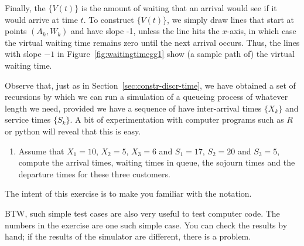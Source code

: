 Finally, the  $\{V(t)\}$ is the
amount of waiting that an arrival would see if it would arrive at time
$t$. To construct $\{V(t)\}$, we simply draw lines that start at
points $(A_k, W_k)$ and have slope -1, unless the line hits the
$x$-axis, in which case the virtual waiting time remains zero until
the next arrival occurs.  Thus, the lines with slope $-1$ in
Figure~\ref{fig:waitingtimegg1} show (a sample path of) the virtual
waiting time.


Observe that, just as in Section~\ref{sec:constr-discr-time}, we have
obtained a set of recursions by which we can run a simulation of a
queueing process of whatever length we need, provided we have a
sequence of have inter-arrival times $\{X_k\}$ and service times
$\{S_k\}$.  A bit of experimentation with computer programs such as
$R$ or python will reveal that this is easy.


\begin{question}
  \begin{enumerate}
  \item Assume that $X_1=10$, $X_2=5$, $X_3=6$ and $S_1 = 17$,
    $S_2=20$ and $S_3=5$, compute the arrival times, waiting times in
    queue, the sojourn times and the departure times for these three
    customers.
  \end{enumerate}
  \begin{solution}
     The intent of this exercise is
      to make you familiar with the notation.

      BTW, such simple test cases are also very useful to test
      computer code. The numbers in the exercise are one such simple
      case. You can check the results by hand; if the results of the
      simulator are different, there is a problem.
    \end{solution}
  \end{question}

